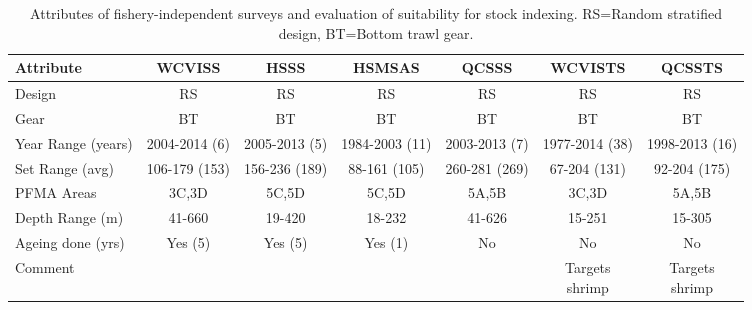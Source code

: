 \begin{table}[b]
\tiny
\centering
\caption{\label{tab:surveySuitability} Attributes of fishery-independent surveys and evaluation of suitability for stock indexing. RS=Random stratified design, BT=Bottom trawl gear.}
\begin{tabular}{lcccccc}
\hline
Attribute                &        WCVISS &          HSSS &         HSMSAS &         QCSSS &        WCVISTS &         QCSSTS \\
\hline
Design                   &            RS &            RS &             RS &            RS &             RS &             RS \\
Gear                     &            BT &            BT &             BT &            BT &             BT &             BT \\
Year Range (years)       & 2004-2014 (6) & 2005-2013 (5) & 1984-2003 (11) & 2003-2013 (7) & 1977-2014 (38) & 1998-2013 (16) \\
Set Range (avg)          & 106-179 (153) & 156-236 (189) &   88-161 (105) & 260-281 (269) &   67-204 (131) &   92-204 (175) \\
PFMA Areas               &         3C,3D &         5C,5D &          5C,5D &         5A,5B &          3C,3D &          5A,5B \\
Depth Range (m)          &        41-660 &        19-420 &         18-232 &        41-626 &         15-251 &         15-305 \\
Ageing done (yrs)        &       Yes (5) &       Yes (5) &        Yes (1) &            No &             No &             No \\
Comment                  &               &               &                &               & \specialcell{Targets\\shrimp} & \specialcell{Targets\\shrimp} \\
\hline
\end{tabular}
\end{table}


\clearpage
